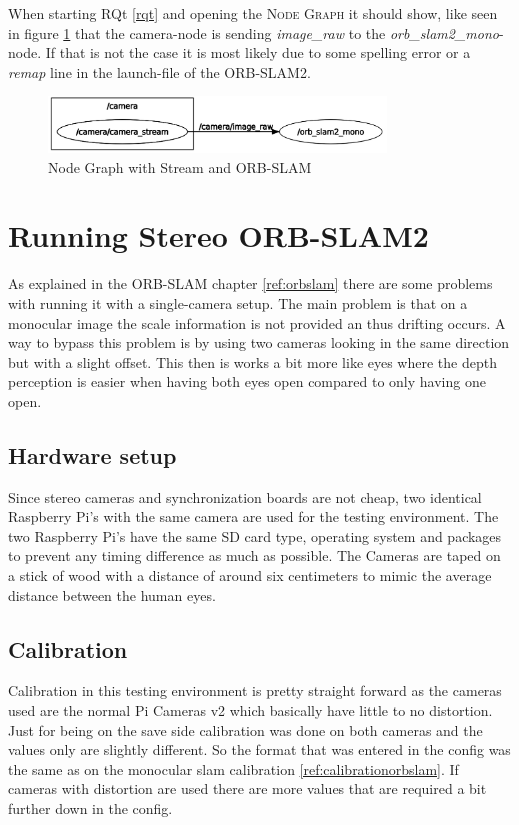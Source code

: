 When starting RQt \ref{rqt} and opening the \textsc{Node Graph} it should show, like seen in figure \ref{img:nodegraphstreamorbslam} that the camera-node is sending \textit{image\_raw} to the \textit{orb\_slam2\_mono}-node. If that is not the case it is most likely due to some spelling error or a \textit{remap} line in the launch-file of the ORB-SLAM2.\newline
\begin{figure}[h]
	\centering
	\includegraphics[width=0.8\textwidth]{./media/images/nodegraphstreamorbslam.png}
  	\caption{Node Graph with Stream and ORB-SLAM}
  	\label{img:nodegraphstreamorbslam}
\end{figure}


\section{Running Stereo ORB-SLAM2\authorA}
As explained in the ORB-SLAM chapter \ref{ref:orbslam} there are some problems with running it with a single-camera setup. The main problem is that on a monocular image the scale information is not provided an thus drifting occurs. A way to bypass this problem is by using two cameras looking in the same direction but with a slight offset. This then is works a bit more like eyes where the depth perception is easier when having both eyes open compared to only having one open.

\subsection{Hardware setup}
Since stereo cameras and synchronization boards are not cheap, two identical Raspberry Pi's with the same camera are used for the testing environment. The two Raspberry Pi's have the same SD card type, operating system and packages to prevent any timing difference as much as possible. The Cameras are taped on a stick of wood with a distance of around six centimeters to mimic the average distance between the human eyes.

\subsection{Calibration}
Calibration in this testing environment is pretty straight forward as the cameras used are the normal Pi Cameras v2 which basically have little to no distortion. Just for being on the save side calibration was done on both cameras and the values only are slightly different. So the format that was entered in the config was the same as on the monocular \gls{slam} calibration \ref{ref:calibrationorbslam}. If cameras with distortion are used there are more values that are required a bit further down in the config.

